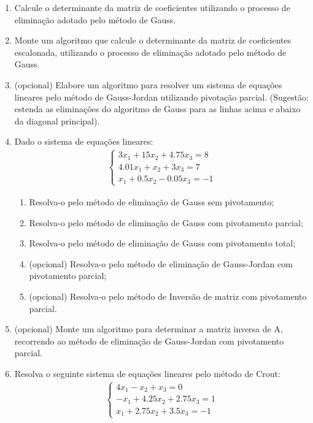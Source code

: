 \documentclass[12pt]{article}
\newenvironment{smallitem}{
    \vspace{-2mm}
    \begin{enumerate}
    \setlength{\parskip}{0pt}
    \setlength{\itemsep}{2pt}
}{
    \vspace{-2mm}
    \end{enumerate}
}
\begin{document}
\begin{enumerate}[label=\textbf{\arabic*})]
\item Calcule o determinante da matriz de coeficientes utilizando o processo de
eliminação adotado pelo método de Gauss.

\item Monte um algoritmo que calcule o determinante da matriz de coeficientes
escalonada, utilizando o processo de eliminação adotado pelo método de Gauss.

\item (opcional) Elabore um algoritmo para resolver um sistema de equações
lineares pelo método de Gauss-Jordan utilizando pivotação parcial. (Sugestão:
estenda as eliminações do algoritmo de Gauss para as linhas acima e abaixo da
diagonal principal).

\item Dado o sistema de equações lineares:
\begin{align*}
\begin{cases}
3 x_1 + 15 x_2 + 4.75 x_3 = 8 \\
4.01 x_1 + x_2 + 3 x_3 = 7 \\
x_1 + 0.5 x_2 - 0.05 x_3 = -1
\end{cases}
\end{align*}

\begin{smallitem}

\item Resolva-o pelo método de eliminação de Gauss sem pivotamento;

\item Resolva-o pelo método de eliminação de Gauss com pivotamento parcial;

\item Resolva-o pelo método de eliminação de Gauss com pivotamento total;

\item (opcional) Resolva-o pelo método de eliminação de Gauss-Jordan com
pivotamento parcial;

\item (opcional) Resolva-o pelo método de Inversão de matriz com pivotamento
parcial.

\end{smallitem}

\item (opcional) Monte um algoritmo para determinar a matriz inversa de A,
recorrendo ao método de eliminação de Gauss-Jordan com pivotamento parcial.

\item Resolva o seguinte sistema de equações lineares pelo método de Crout:
\begin{align*}
\begin{cases}
4 x_1 - x_2 + x_3 = 0 \\
- x_1 + 4.25 x_2 + 2.75 x_3 = 1 \\
x_1 + 2.75 x_2 + 3.5 x_3 = -1
\end{cases}
\end{align*}


\end{enumerate}
\end{document}
